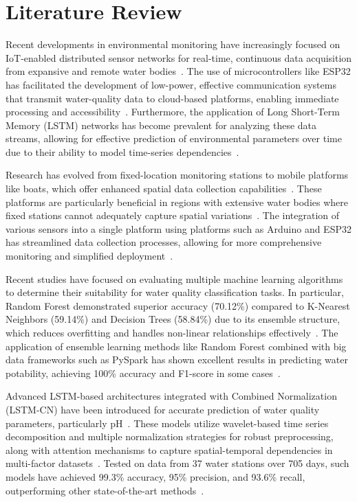 \documentclass[conference]{IEEEtran}
\begin{document}
\section{Literature Review}
Recent developments in environmental monitoring have increasingly focused on IoT-enabled distributed sensor networks for real-time, continuous data acquisition from expansive and remote water bodies~\cite{b2}. The use of microcontrollers like ESP32 has facilitated the development of low-power, effective communication systems that transmit water-quality data to cloud-based platforms, enabling immediate processing and accessibility~\cite{b2}. Furthermore, the application of Long Short-Term Memory (LSTM) networks has become prevalent for analyzing these data streams, allowing for effective prediction of environmental parameters over time due to their ability to model time-series dependencies~\cite{b1,b6}.

Research has evolved from fixed-location monitoring stations to mobile platforms like boats, which offer enhanced spatial data collection capabilities~\cite{b3}. These platforms are particularly beneficial in regions with extensive water bodies where fixed stations cannot adequately capture spatial variations~\cite{b3}. The integration of various sensors into a single platform using platforms such as Arduino and ESP32 has streamlined data collection processes, allowing for more comprehensive monitoring and simplified deployment~\cite{b2,b3}.

Recent studies have focused on evaluating multiple machine learning algorithms to determine their suitability for water quality classification tasks. In particular, Random Forest demonstrated superior accuracy (70.12\%) compared to K-Nearest Neighbors (59.14\%) and Decision Trees (58.84\%) due to its ensemble structure, which reduces overfitting and handles non-linear relationships effectively~\cite{b4}. The application of ensemble learning methods like Random Forest combined with big data frameworks such as PySpark has shown excellent results in predicting water potability, achieving 100\% accuracy and F1-score in some cases~\cite{b5}.

Advanced LSTM-based architectures integrated with Combined Normalization (LSTM-CN) have been introduced for accurate prediction of water quality parameters, particularly pH~\cite{b6}. These models utilize wavelet-based time series decomposition and multiple normalization strategies for robust preprocessing, along with attention mechanisms to capture spatial-temporal dependencies in multi-factor datasets~\cite{b1,b6}. Tested on data from 37 water stations over 705 days, such models have achieved 99.3\% accuracy, 95\% precision, and 93.6\% recall, outperforming other state-of-the-art methods~\cite{b6}.
\end{document}
